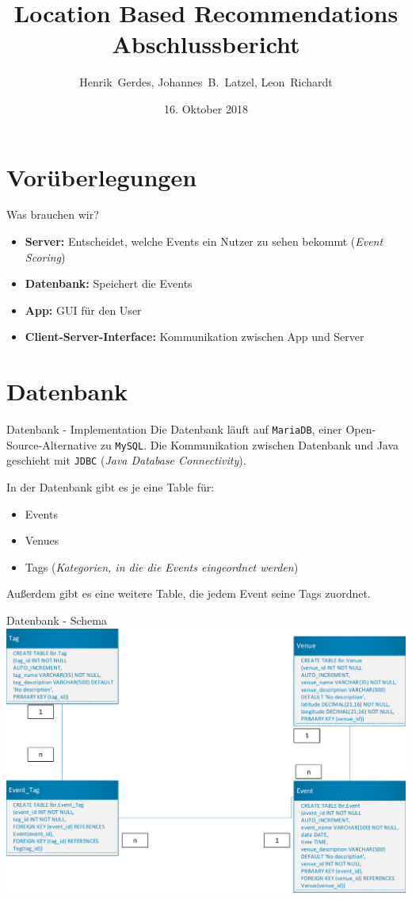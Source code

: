 \documentclass{beamer}
\title{Location Based Recommendations\\Abschlussbericht}
\author[H.~Gerdes, J.B.~Latzel, L.~Richardt]{Henrik~Gerdes, Johannes~B.~Latzel, Leon~Richardt}
\institute{Universität Osnabrück}
\date[16.10.2018]{16. Oktober 2018}
\begin{document}
	
	\begin{frame}
		\titlepage
	\end{frame}

	\section{Vorüberlegungen}
	\begin{frame}{Was brauchen wir?}
			\begin{itemize}
				\item \textbf{Server:} Entscheidet, welche Events ein Nutzer zu sehen bekommt (\textit{Event Scoring})
				\item \textbf{Datenbank:} Speichert die Events
				\item \textbf{App:} GUI für den User
				\item \textbf{Client-Server-Interface:} Kommunikation zwischen App und Server
			\end{itemize}
	\end{frame}

	\section{Datenbank}
	\begin{frame}{Datenbank - Implementation}
		Die Datenbank läuft auf \alert{\texttt{MariaDB}}, einer Open-Source-Alternative zu \texttt{MySQL}. Die Kommunikation zwischen Datenbank und Java geschieht mit \alert{\texttt{JDBC}} (\textit{Java Database Connectivity}).
		
		\pause
		In der Datenbank gibt es je eine Table für:
		\begin{itemize}
			\item Events
			\item Venues
			\item Tags (\textit{Kategorien, in die die Events eingeordnet werden})
		\end{itemize}
		Außerdem gibt es eine weitere Table, die jedem Event seine Tags zuordnet.
		
	\end{frame}

	\begin{frame}{Datenbank - Schema}
		\centering\includegraphics[width = \linewidth]{db_scheme}
	\end{frame}
\end{document}

